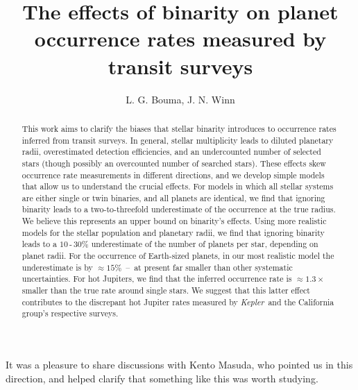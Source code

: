 \documentclass[12pt,modern]{aastex61}
\begin{document}
    
\title{ The effects of binarity on planet occurrence rates measured by transit 
surveys}

\author{
L. G. Bouma, J. N. Winn
}

\begin{abstract}

This work aims to clarify the biases that stellar binarity introduces
to occurrence rates inferred from transit surveys.
In general, stellar multiplicity leads to diluted planetary 
radii, overestimated detection efficiencies, and an undercounted number of 
selected stars (though possibly an overcounted number of searched stars).
These effects skew occurrence rate measurements in different directions, and 
we develop simple models that allow us to understand the crucial effects.
For models in which all stellar systems are either single or twin binaries, 
and all planets are identical, we find that ignoring binarity leads to a
two-to-threefold underestimate of the occurrence at the true radius.
We believe this represents an upper bound on binarity's effects.
Using more realistic models for the stellar population and planetary 
radii, we find that ignoring binarity leads to a $10$\,-\,$30\%$ 
underestimate of the number of planets per star, depending on planet radii.
For the occurrence of Earth-sized planets, in our most realistic model the 
underestimate is by $\approx 15\%$~--~at present far smaller than other 
systematic uncertainties.
For hot Jupiters, we find that the inferred occurrence rate is 
$\approx 1.3\times$ smaller than the true rate around single stars.
We suggest that this latter effect contributes to the discrepant hot Jupiter 
rates measured by {\it Kepler}\ and the California group's respective surveys.
\end{abstract}







\acknowledgements
It was a pleasure to share discussions with Kento Masuda, who pointed us in 
this direction, and helped clarify that something like this was worth studying.



\end{document}

